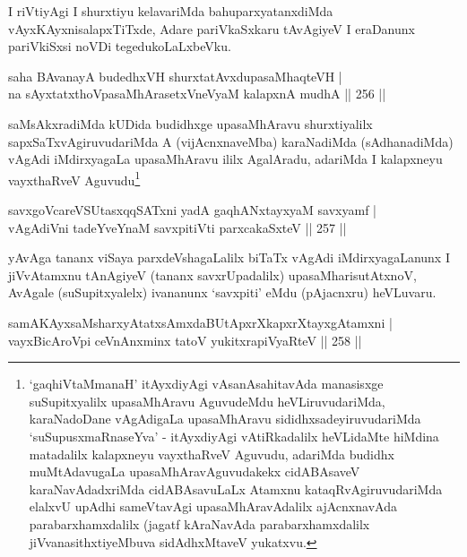 \begin{artha}
I riVtiyAgi I shurxtiyu kelavariMda bahuparxyatanxdiMda  vAyxKAyxnisalapxTiTxde, Adare pariVkaSxkaru tAvAgiyeV I eraDanunx pariVkiSxsi noVDi tegedukoLaLxbeVku.
\end{artha}


\begin{shl}
saha BAvanayA budedhxVH shurxtatAvxdupasaMhaqteVH |\\
na sAyxtatxthoVpasaMhArasetxVneVyaM kalapxnA mudhA \hfill || 256 ||
\end{shl}

\begin{artha}
saMsAkxradiMda kUDida budidhxge upasaMhAravu shurxtiyalilx  sapxSaTxvAgiruvuda\-riMda A (vijAcnxnaveMba) karaNadiMda (sAdhanadiMda)  vAgAdi iMdirxyagaLa upa\-saMhAravu ililx AgalAradu, adariMda I kalapxneyu vayxthaRveV Aguvudu\footnote{`gaqhiVtaMmanaH' itAyxdiyAgi vAsanAsahitavAda manasisxge suSupitxyalilx upasaMhAravu AguvudeMdu heVLiruvudariMda, karaNadoDane vAgAdigaLa upasaMhAravu sididhxsadeyiruvuda\-riMda `suSupusxmaRnaseYva' - itAyxdiyAgi vAtiRkadalilx heVLidaMte hiMdina matadalilx kalapxneyu vayxthaRveV Aguvudu, adariMda budidhx muMtAdavugaLa upasaMhAravAguvudakekx cidABAsaveV karaNavAdadxriMda cidABAsavuLaLx Atamxnu kataqRvAgiruvudariMda elalxvU upAdhi sameVtavAgi upasaMhAravAdalilx ajAcnxnavAda parabarxhamxdalilx (jagatf kAraNavAda parabarxhamxdalilx jiVvanasithxtiyeMbuva sidAdhxMtaveV yukatxvu.}
\end{artha}


\begin{shl}
savxgoVcareVSUtasxqqSATxni yadA gaqhANxtayxyaM savxyamf |\\
vAgAdiVni tadeYveYnaM savxpitiVti parxcakaSxteV \hfill || 257 ||
\end{shl}

\begin{artha}
yAvAga tananx viSaya parxdeVshagaLalilx biTaTx vAgAdi iMdirxyagaLanunx  I jiVvAtamxnu tAnAgiyeV (tananx savxrUpadalilx) upasaMharisutAtxnoV, AvAgale (suSupitxyalelx) ivananunx `savxpiti' eMdu (pAjacnxru) heVLuvaru.
\end{artha}


\begin{shl}
samAKAyxsaMsharxyAtatxsAmxdaBUtApxrXkapxrXtayxgAtamxni |\\
vayxBicAroV\s pi ceVnAnxminx tatoV yukitxrapiVyaRteV \hfill || 258 ||
\end{shl}

